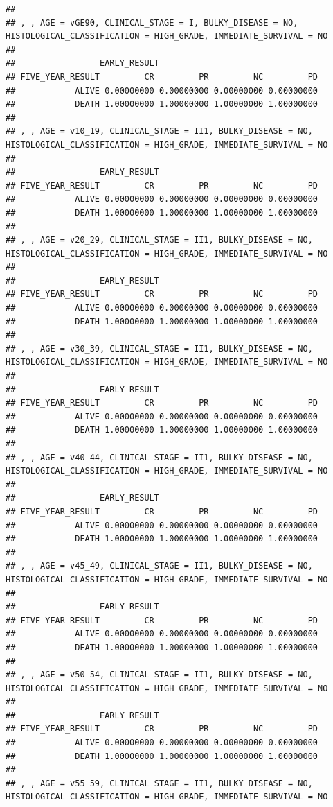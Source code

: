 \documentclass[]{article}
\begin{document}
\begin{verbatim}
## 
## , , AGE = vGE90, CLINICAL_STAGE = I, BULKY_DISEASE = NO, HISTOLOGICAL_CLASSIFICATION = HIGH_GRADE, IMMEDIATE_SURVIVAL = NO
## 
##                 EARLY_RESULT
## FIVE_YEAR_RESULT         CR         PR         NC         PD
##            ALIVE 0.00000000 0.00000000 0.00000000 0.00000000
##            DEATH 1.00000000 1.00000000 1.00000000 1.00000000
## 
## , , AGE = v10_19, CLINICAL_STAGE = II1, BULKY_DISEASE = NO, HISTOLOGICAL_CLASSIFICATION = HIGH_GRADE, IMMEDIATE_SURVIVAL = NO
## 
##                 EARLY_RESULT
## FIVE_YEAR_RESULT         CR         PR         NC         PD
##            ALIVE 0.00000000 0.00000000 0.00000000 0.00000000
##            DEATH 1.00000000 1.00000000 1.00000000 1.00000000
## 
## , , AGE = v20_29, CLINICAL_STAGE = II1, BULKY_DISEASE = NO, HISTOLOGICAL_CLASSIFICATION = HIGH_GRADE, IMMEDIATE_SURVIVAL = NO
## 
##                 EARLY_RESULT
## FIVE_YEAR_RESULT         CR         PR         NC         PD
##            ALIVE 0.00000000 0.00000000 0.00000000 0.00000000
##            DEATH 1.00000000 1.00000000 1.00000000 1.00000000
## 
## , , AGE = v30_39, CLINICAL_STAGE = II1, BULKY_DISEASE = NO, HISTOLOGICAL_CLASSIFICATION = HIGH_GRADE, IMMEDIATE_SURVIVAL = NO
## 
##                 EARLY_RESULT
## FIVE_YEAR_RESULT         CR         PR         NC         PD
##            ALIVE 0.00000000 0.00000000 0.00000000 0.00000000
##            DEATH 1.00000000 1.00000000 1.00000000 1.00000000
## 
## , , AGE = v40_44, CLINICAL_STAGE = II1, BULKY_DISEASE = NO, HISTOLOGICAL_CLASSIFICATION = HIGH_GRADE, IMMEDIATE_SURVIVAL = NO
## 
##                 EARLY_RESULT
## FIVE_YEAR_RESULT         CR         PR         NC         PD
##            ALIVE 0.00000000 0.00000000 0.00000000 0.00000000
##            DEATH 1.00000000 1.00000000 1.00000000 1.00000000
## 
## , , AGE = v45_49, CLINICAL_STAGE = II1, BULKY_DISEASE = NO, HISTOLOGICAL_CLASSIFICATION = HIGH_GRADE, IMMEDIATE_SURVIVAL = NO
## 
##                 EARLY_RESULT
## FIVE_YEAR_RESULT         CR         PR         NC         PD
##            ALIVE 0.00000000 0.00000000 0.00000000 0.00000000
##            DEATH 1.00000000 1.00000000 1.00000000 1.00000000
## 
## , , AGE = v50_54, CLINICAL_STAGE = II1, BULKY_DISEASE = NO, HISTOLOGICAL_CLASSIFICATION = HIGH_GRADE, IMMEDIATE_SURVIVAL = NO
## 
##                 EARLY_RESULT
## FIVE_YEAR_RESULT         CR         PR         NC         PD
##            ALIVE 0.00000000 0.00000000 0.00000000 0.00000000
##            DEATH 1.00000000 1.00000000 1.00000000 1.00000000
## 
## , , AGE = v55_59, CLINICAL_STAGE = II1, BULKY_DISEASE = NO, HISTOLOGICAL_CLASSIFICATION = HIGH_GRADE, IMMEDIATE_SURVIVAL = NO

\end{verbatim}
\end{document}
